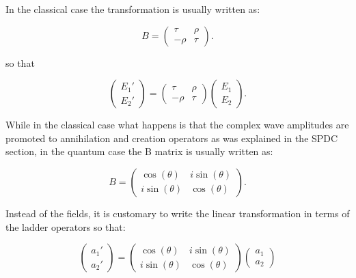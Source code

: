 \documentclass[12pt]{article}
\begin{document}
 In the classical case the transformation is usually written as:
 
 \begin{equation}
 B=\begin{pmatrix} \tau & \rho \\ -\rho & \tau \end{pmatrix}.
 \end{equation} 


so that 

\begin{equation}
\begin{pmatrix} E_{1}' \\ E_{2}' \end{pmatrix}=\begin{pmatrix} \tau & \rho \\ -\rho & \tau \end{pmatrix} \begin{pmatrix} E_{1} \\ E_{2} \end{pmatrix}.
\end{equation}

While in the classical case what happens is that the complex wave amplitudes are promoted to annihilation and creation operators as was explained in the SPDC section, in the quantum case the B matrix is usually written as:

\begin{equation} 
B=\begin{pmatrix} \cos(\theta) & i \sin(\theta) \\ i \sin(\theta) & \cos(\theta) \end{pmatrix}.
\end{equation}

Instead of the fields, it is customary to write the linear transformation in terms of the ladder operators so that:

\begin{equation}
\begin{pmatrix} a_{1}' \\ a_{2}' \end{pmatrix}=\begin{pmatrix} \cos(\theta) & i \sin(\theta) \\ i \sin(\theta) & \cos(\theta) \end{pmatrix} \begin{pmatrix} a_{1} \\ a_{2} \end{pmatrix}
\end{equation}
\end{document}
